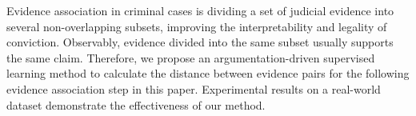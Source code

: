 Evidence association in criminal cases is dividing a set of judicial evidence into several non-overlapping subsets, improving the interpretability and legality of conviction. Observably, evidence divided into the same subset usually supports the same claim. Therefore, we propose an argumentation-driven supervised learning method to calculate the distance between evidence pairs for the following evidence association step in this paper. Experimental results on a real-world dataset demonstrate the effectiveness of our method.
